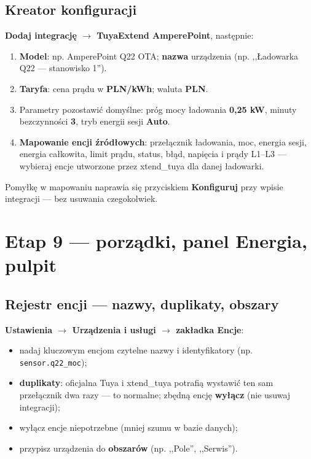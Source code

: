 \documentclass[11pt,a4paper]{article}
\begin{document}
\subsection{Kreator konfiguracji}

\textbf{Dodaj integrację $\to$ TuyaExtend AmperePoint}, następnie:

\begin{enumerate}
\item \textbf{Model}: np. AmperePoint Q22 OTA; \textbf{nazwa} urządzenia (np. ,,Ładowarka Q22 --- stanowisko 1'').
\item \textbf{Taryfa}: cena prądu w \textbf{PLN/kWh}; waluta \textbf{PLN}.
\item Parametry pozostawić domyślne: próg mocy ładowania \textbf{0{,}25 kW}, minuty bezczynności \textbf{3}, tryb energii sesji \textbf{Auto}.
\item \textbf{Mapowanie encji źródłowych}: przełącznik ładowania, moc, energia sesji, energia całkowita, limit prądu, status, błąd, napięcia i prądy L1--L3 --- wybieraj encje utworzone przez xtend\_tuya dla danej ładowarki.
\end{enumerate}

Pomyłkę w mapowaniu naprawia się przyciskiem \textbf{Konfiguruj} przy wpisie integracji --- bez usuwania czegokolwiek.

\section{Etap 9 --- porządki, panel Energia, pulpit}
\label{sec:etap9}

\subsection{Rejestr encji --- nazwy, duplikaty, obszary}

\textbf{Ustawienia $\to$ Urządzenia i usługi $\to$ zakładka Encje}:
\begin{itemize}
\item nadaj kluczowym encjom czytelne nazwy i identyfikatory (np. \texttt{sensor.q22\_moc});
\item \textbf{duplikaty}: oficjalna Tuya i xtend\_tuya potrafią wystawić ten sam przełącznik dwa razy --- to normalne; zbędną encję \textbf{wyłącz} (nie usuwaj integracji);
\item wyłącz encje niepotrzebne (mniej szumu w bazie danych);
\item przypisz urządzenia do \textbf{obszarów} (np. ,,Pole'', ,,Serwis'').
\end{itemize}
\end{document}
